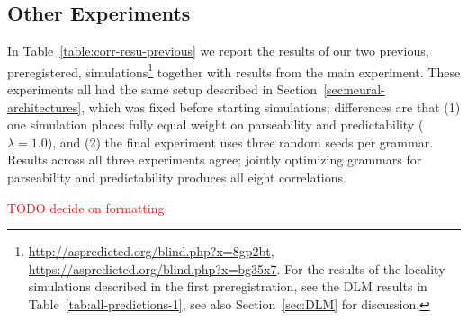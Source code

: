 \documentclass[10pt,twoside,lineno]{article}
\begin{document}
\subsection{Other Experiments}
In Table~\ref{table:corr-resu-previous} we report the results of our two previous, preregistered, simulations\footnote{\url{http://aspredicted.org/blind.php?x=8gp2bt}, \url{https://aspredicted.org/blind.php?x=bg35x7}. For the results of the locality simulations described in the first preregistration, see the DLM results in Table~\ref{tab:all-predictions-1}, see also Section~\ref{sec:DLM} for discussion.} together with results from the main experiment.
These experiments all had the same setup described in Section~\ref{sec:neural-architectures}, which was fixed before starting simulations; differences are that (1) one simulation places fully equal weight on parseability and predictability ($\lambda=1.0$), and (2) the final experiment uses three random seeds per grammar.
Results across all three experiments agree; jointly optimizing grammars for parseability and predictability produces all eight correlations.


\textcolor{red}{TODO decide on formatting}
\end{document}

